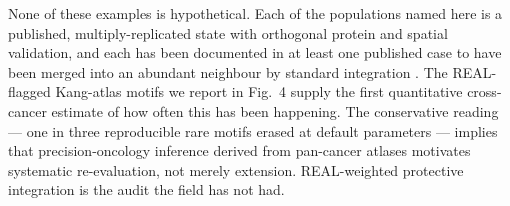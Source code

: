 None of these examples is hypothetical. Each of the populations named here is a published, multiply-replicated state with orthogonal protein and spatial validation, and each has been documented in at least one published case to have been merged into an abundant neighbour by standard integration \citep{Maier2020Nature,Miller2019NatImmunol,Puram2017Cell,Elyada2019CancerDiscov,NalioRamos2022Cell}. The REAL-flagged Kang-atlas motifs we report in Fig.\ 4 supply the first quantitative cross-cancer estimate of how often this has been happening. The conservative reading --- one in three reproducible rare motifs erased at default parameters --- implies that precision-oncology inference derived from pan-cancer atlases motivates systematic re-evaluation, not merely extension. REAL-weighted protective integration is the audit the field has not had.


